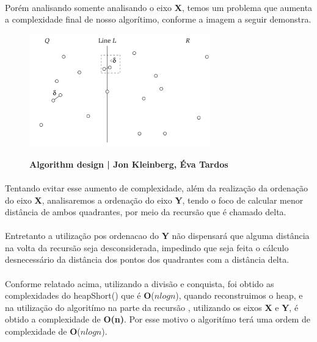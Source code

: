 \documentclass[12pt]{article}
\begin{document}
\paragraph{}Porém analisando somente analisando o  eixo \textbf{X}, temos um problema que aumenta a complexidade final de nosso algorítimo, conforme a imagem a seguir demonstra.




\begin{center}
    \begin{figure}[h!]
        \centering
        \includegraphics[width=0.7\textwidth]{imagens/2Imagem.png}
        
        
        \textbf{Algorithm design | Jon Kleinberg, Éva Tardos} 
    \end{figure}
\end{center}

\newpage

\paragraph{} Tentando evitar esse aumento de complexidade, além da realização da ordenação do eixo \textbf{X}, analisaremos a ordenação do eixo \textbf{Y}, tendo o foco de calcular  menor  distância de ambos quadrantes, por meio da recursão que é chamado delta.
\paragraph{}Entretanto a utilização pos ordenacao do \textbf{Y} não dispensará que alguma distância na volta da recursão seja desconsiderada, impedindo que seja feita o cálculo desnecessário da distância dos pontos dos quadrantes com a distância delta.

\paragraph{}Conforme relatado acima, utilizando a divisão e conquista, foi obtido as complexidades do heapShort() que é \textbf{O}($nlogn$), quando reconstruimos o heap, e na utilizaçäo do algoritímo na parte da recursão , utilizando os eixos \textbf{X} e \textbf{Y}, é obtido a complexidade de \textbf{O(n)}. Por esse motivo o algoritímo terá uma ordem de complexidade de \textbf{O}($nlogn$).
\end{document}
